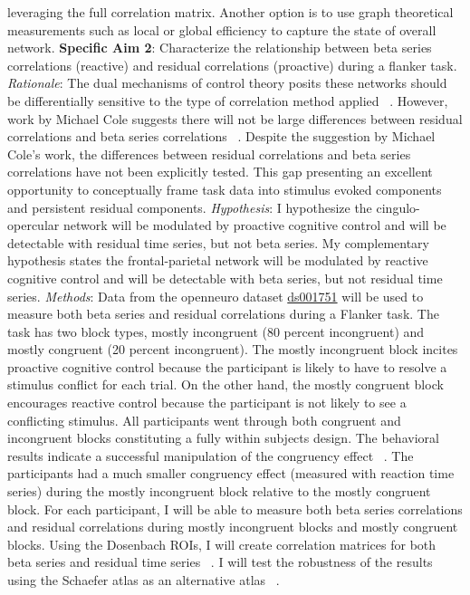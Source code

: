 \documentclass[phd,appendix,figures]{uithesis}
\begin{document}
leveraging the full correlation matrix.
Another option is to use graph theoretical measurements such as local or global efficiency to capture the state of overall network.
\newline
\newline
\textbf{Specific Aim 2}: Characterize the relationship between beta series correlations (reactive) and residual correlations (proactive) during a flanker task.
\newline
\newline
\textit{Rationale}: The dual mechanisms of control theory posits these networks should be differentially sensitive to the type of correlation method applied ~\citep{Dosenbach2007,Braver2006}.
However, work by Michael Cole suggests there will not be large differences between residual correlations and beta series correlations ~\citep{Cole2019}.
Despite the suggestion by Michael Cole's work, the differences between residual correlations and beta series correlations have not been explicitly tested.
This gap presenting an excellent opportunity to conceptually frame task data into stimulus evoked components and persistent residual components.
\newline
\newline
\textit{Hypothesis}:
I hypothesize the cingulo-opercular network will be modulated by proactive cognitive control and will be detectable with residual time series, but not beta series.
My complementary hypothesis states the frontal-parietal network will be modulated by reactive cognitive control and will be detectable with beta series, but not residual time series. 
\newline
\newline
\textit{Methods}:
Data from the openneuro dataset \href{https://openneuro.org/datasets/ds001751/versions/1.0.0}{ds001751} will be used to measure both beta series and residual correlations during a Flanker task.
The task has two block types, mostly incongruent (80 percent incongruent) and mostly congruent (20 percent incongruent).
The mostly incongruent block incites proactive cognitive control because the participant is likely to have to resolve a stimulus conflict for each trial.
On the other hand, the mostly congruent block encourages reactive control because the participant is not likely to see a conflicting stimulus.
All participants went through both congruent and incongruent blocks constituting a fully within subjects design.
The behavioral results indicate a successful manipulation of the congruency effect ~\citep{Aben2019}.
The participants had a much smaller congruency effect (measured with reaction time series) during the mostly incongruent block relative to the mostly congruent block.
For each participant, I will be able to measure both beta series correlations and residual correlations during mostly incongruent blocks and mostly congruent blocks. 
Using the Dosenbach ROIs, I will create correlation matrices for both beta series and residual time series ~\citep{Dosenbach2010}.
I will test the robustness of the results using the Schaefer atlas as an alternative atlas ~\citep{schaefer2017}.
\end{document}
